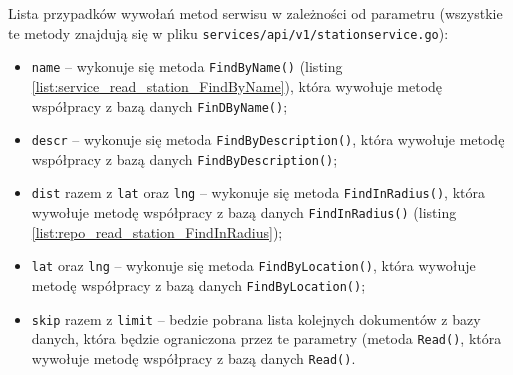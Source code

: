 Lista przypadków wywołań metod serwisu w zależności od parametru (wszystkie te metody znajdują się w pliku \texttt{services/api/v1/stationservice.go}):
\begin{itemize}
    \item \texttt{name} -- wykonuje się metoda \texttt{FindByName()} (listing \ref{list:service_read_station_FindByName}), która wywołuje metodę współpracy z bazą danych \texttt{FinDByName()};
    \item \texttt{descr} -- wykonuje się metoda \texttt{FindByDescription()}, która wywołuje metodę współpracy z bazą danych \texttt{FindByDescription()};
    \item \texttt{dist} razem z \texttt{lat} oraz \texttt{lng} -- wykonuje się metoda \texttt{FindInRadius()}, która wywołuje metodę współpracy z bazą danych \texttt{FindInRadius()} (listing \ref{list:repo_read_station_FindInRadius});
    \item \texttt{lat} oraz \texttt{lng} -- wykonuje się metoda \texttt{FindByLocation()}, która wywołuje metodę współpracy z bazą danych \texttt{FindByLocation()};
    \item \texttt{skip} razem z \texttt{limit} -- bedzie pobrana lista kolejnych dokumentów z bazy danych, która będzie ograniczona przez te parametry (metoda \texttt{Read()}, która wywołuje metodę współpracy z bazą danych \texttt{Read()}.
\end{itemize}

